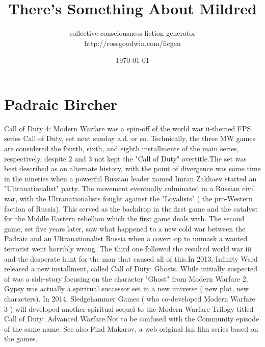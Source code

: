 \documentclass[12pt]{book}
\title{There's Something About Mildred}
\author{collective consciousness fiction generator\\http://rossgoodwin.com/ficgen}
\date{\today}
\begin{document}
\maketitle



\chapter{Padraic Bircher}

Call of Duty 4: Modern Warfare was a spin-off of the world war ii-themed FPS series Call of Duty, set next sunday a.d. or so. Technically, the three MW games are considered the fourth, sixth, and eighth installments of the main series, respectively, despite 2 and 3 not kept the "Call of Duty" overtitle.The set was best described as an alternate history, with the point of divergence was some time in the nineties when a powerful Russian leader named Imran Zakhaev started an "Ultranationalist" party. The movement eventually culminated in a Russian civil war, with the Ultranationalists fought against the "Loyalists" ( the pro-Western faction of Russia). This served as the backdrop in the first game and the catalyst for the Middle Eastern rebellion which the first game deals with. The second game, set five years later, saw what happened to a new cold war between the Padraic and an Ultranationalist Russia when a covert op to unmask a wanted terrorist went horribly wrong. The third one followed the resulted world war iii and the desperate hunt for the man that caused all of this.In 2013, Infinity Ward released a new installment, called Call of Duty: Ghosts. While initially suspected of was a side-story focusing on the character "Ghost" from Modern Warfare 2, Gypsy was actually a spiritual successor set in a new universe ( new plot, new characters). In 2014, Sledgehammer Games ( who co-developed Modern Warfare 3 ) will developed another spiritual sequel to the Modern Warfare Trilogy titled Call of Duty: Advanced Warfare.Not to be confused with the Community episode of the same name. See also Find Makarov, a web original fan film series based on the games.
\end{document}

